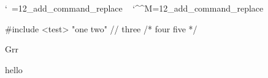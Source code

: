 \bgroup\catcode`\ =12\relax\lowercase{\egroup\_add_command_replace{ }{\w\ \w}}
\bgroup\catcode`\^^M=12\relax\lowercase{\egroup\_add_command_replace{^^M}{\w\n\n\w}}

\def\loadsyntax#1{}


\blisting \loadsyntax{C}
#include <test>
"one
two"
// three
/* four
five */
\elisting

Grr

\blisting
hello
\elisting

\bye

